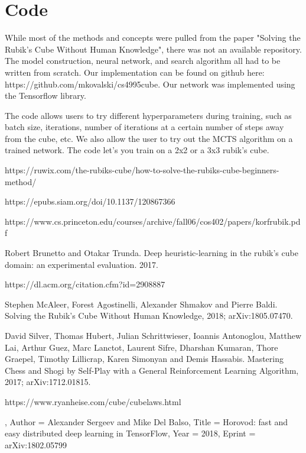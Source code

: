 \documentclass[10pt,twocolumn,letterpaper]{article}
\begin{document}



\section{Code}

While most of the methods and concepts were pulled from the paper "Solving the Rubik’s Cube Without Human Knowledge", there was not an available repository.  The model construction, neural network, and search algorithm all had to be written from scratch.  Our implementation can be found on github here: https://github.com/mkovalski/cs4995\textunderscore cube.  Our network was implemented using the Tensorflow library. 

The code allows users to try different hyperparameters during training, such as batch size, iterations, number of iterations at a certain number of steps away from the cube, etc.   We also allow the user to try out the MCTS algorithm on a trained network. The code let's you train on a 2x2 or a 3x3 rubik's cube. 




\begin{thebibliography}{9}

\bibitem{}
https://ruwix.com/the-rubiks-cube/how-to-solve-the-rubiks-cube-beginners-method/

\bibitem{}
https://epubs.siam.org/doi/10.1137/120867366

\bibitem{}
https://www.cs.princeton.edu/courses/archive/fall06/cos402/papers/korfrubik.pdf

\bibitem{}
Robert Brunetto and Otakar Trunda. Deep heuristic-learning in the rubik’s cube domain: an experimental evaluation. 2017.

\bibitem{}
https://dl.acm.org/citation.cfm?id=2908887

Stephen McAleer, Forest Agostinelli, Alexander Shmakov and Pierre Baldi.
\newblock Solving the Rubik's Cube Without Human Knowledge, 2018;
\newblock arXiv:1805.07470.

David Silver, Thomas Hubert, Julian Schrittwieser, Ioannis Antonoglou, Matthew Lai, Arthur Guez, Marc Lanctot, Laurent Sifre, Dharshan Kumaran, Thore Graepel, Timothy Lillicrap, Karen Simonyan and Demis Hassabis.
\newblock Mastering Chess and Shogi by Self-Play with a General Reinforcement Learning Algorithm, 2017;
\newblock arXiv:1712.01815.

\bibitem{}
https://www.ryanheise.com/cube/cube\textunderscore laws.html

,
Author = {Alexander Sergeev and Mike Del Balso},
Title = {Horovod: fast and easy distributed deep learning in TensorFlow},
Year = {2018},
Eprint = {arXiv:1802.05799}

\end{thebibliography}

{\small


}
\end{document}
